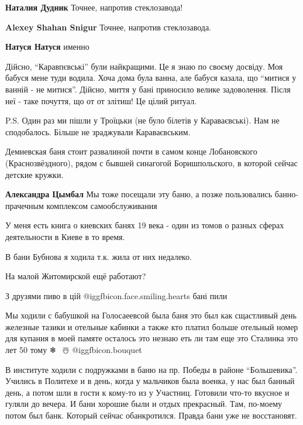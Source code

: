 \begin{itemize}
\begin{itemize}
\begin{itemize}
\textbf{Наталия Дудник} Точнее, напротив стеклозавода!

\textbf{Alexey Shahan Snigur} Точнее, напротив стеклозавода.

\textbf{Натуся Натуся} именно
\end{itemize} %

\end{itemize} %


Дійсно, \enquote{Каравпєвські} були найкращими. Це я знаю по своєму досвіду. Моя бабуся
мене туди водила. Хоча дома була ванна, але бабуся казала, що \enquote{митися у ванній
- не митися}. Дійсно, миття у бані приносило велике задоволення. Після неї -
таке почуття, що от от злітиш! Це цілий ритуал.

P.S. Один раз ми пішли у Троїцьки (не було білетів у Караваєвські). Нам не
сподобалось. Більше не зраджували Караваєвським.


Демиевская баня стоит развалиной почти в самом конце Лобановского
(Краснозвёздного), рядом с бывшей синагогой Боришпольского, в которой сейчас
детские кружки.

\textbf{Александра Цымбал} Мы тоже посещали эту баню, а позже пользовались банно-прачечным комплексом самообслуживания

У меня есть книга о киевских банях 19 века - один из томов о разных сферах деятельности в Киеве в то время.

В бани Бубнова я ходила т.к. жила от них недалеко.

На малой Житомирской ещё работают?

З друзями пиво в цій  @igg{fbicon.face.smiling.hearts} бані пили


Мы ходили с бабушкой на Голосаеевсой была баня это был как сщастливый день
железные тазики и отельные кабинки а также кто платил больше отельный номер для
купания в моей памяте осталось это незнаю еть ли там еще это Сталинка это лет 50
тому  ❄ ️ ☃️ @igg{fbicon.bouquet} 


В институте ходили с подружками в баню на пр. Победы в районе \enquote{Большевика}.
Учились в Политехе и в день, когда у мальчиков была военка, у нас был банный
день, а потом шли в гости к кому-то из у Участниц. Готовили что-то вкусное и
гуляли до вечера. И бани хорошие были и отдых прекрасный. Там, по-моему потом
был банк. Который сейчас обанкротился. Правда бани уже не восстановят.


\end{itemize}
